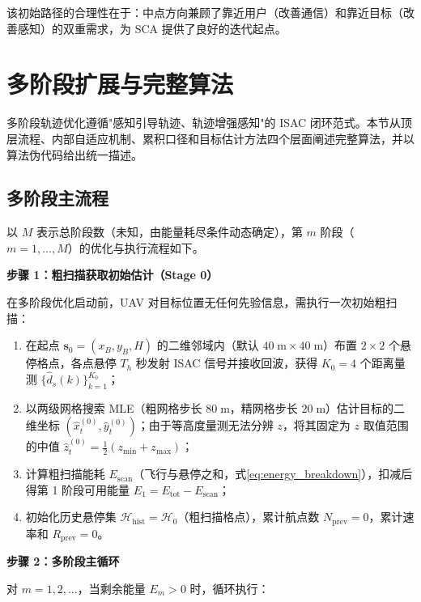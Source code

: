 该初始路径的合理性在于：中点方向兼顾了靠近用户（改善通信）和靠近目标（改善感知）的双重需求，为 SCA 提供了良好的迭代起点。

\section{多阶段扩展与完整算法}
\label{sec:multistage}

多阶段轨迹优化遵循"感知引导轨迹、轨迹增强感知"的 ISAC 闭环范式。本节从顶层流程、内部自适应机制、累积口径和目标估计方法四个层面阐述完整算法，并以算法伪代码给出统一描述。

\subsection{多阶段主流程}

以 $M$ 表示总阶段数（未知，由能量耗尽条件动态确定），第 $m$ 阶段（$m=1,\ldots,M$）的优化与执行流程如下。

\medskip
\noindent\textbf{步骤 1：粗扫描获取初始估计（Stage 0）}

在多阶段优化启动前，UAV 对目标位置无任何先验信息，需执行一次初始粗扫描：
\begin{enumerate}
    \item[1-1)] 在起点 $\mathbf{s}_0=(x_B,y_B,H)$ 的二维邻域内（默认 $40\;\mathrm{m}\times 40\;\mathrm{m}$）布置 $2\times 2$ 个悬停格点，各点悬停 $T_h$ 秒发射 ISAC 信号并接收回波，获得 $K_0=4$ 个距离量测 $\{\widehat{d}_s(k)\}_{k=1}^{K_0}$；
    \item[1-2)] 以两级网格搜索 MLE（粗网格步长 $80\;\mathrm{m}$，精网格步长 $20\;\mathrm{m}$）估计目标的二维坐标 $(\hat{x}_t^{(0)},\hat{y}_t^{(0)})$；由于等高度量测无法分辨 $z$，将其固定为 $z$ 取值范围的中值 $\hat{z}_t^{(0)}=\frac{1}{2}(z_{\min}+z_{\max})$；
    \item[1-3)] 计算粗扫描能耗 $E_{\mathrm{scan}}$（飞行与悬停之和，式\eqref{eq:energy_breakdown}），扣减后得第 1 阶段可用能量 $E_1=E_{\mathrm{tot}}-E_{\mathrm{scan}}$；
    \item[1-4)] 初始化历史悬停集 $\mathcal{H}_{\mathrm{hist}}=\mathcal{H}_0$（粗扫描格点），累计航点数 $N_{\mathrm{prev}}=0$，累计速率和 $R_{\mathrm{prev}}=0$。
\end{enumerate}

\noindent\textbf{步骤 2：多阶段主循环}

对 $m=1,2,\ldots$，当剩余能量 $E_m>0$ 时，循环执行：

